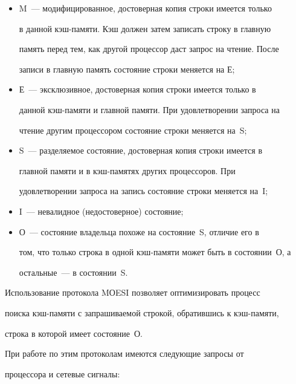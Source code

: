       \begin{itemize}


\item M~--- модифицированное, достоверная копия строки имеется только 


в данной кэш-памяти. Кэш должен затем записать строку в главную 


память перед тем, как другой процессор даст запрос на чтение. После 


записи в главную память состояние строки меняется на  Е;


\item Е~--- эксклюзивное, достоверная копия строки имеется только в 


данной кэш-па\-мя\-ти и главной памяти. При удовлетворении запроса на 


чтение другим процессором состояние строки меняется на~S;


\item  S~--- разделяемое состояние, достоверная копия строки имеется в 


главной памяти и в кэш-памятях других процессоров. При 


удовлетворении запроса на запись состояние строки меняется на~I;


\item  I~--- невалидное (недостоверное) состояние;


\item О~--- состояние владельца похоже на состояние~S, отличие его в 


том, что только строка в одной кэш-памяти может быть в состоянии~О, а 


остальные~--- в состоянии~S.


\end{itemize}





      Использование протокола MОESI  позволяет оптимизировать процесс 


поиска кэш-памяти с запрашиваемой строкой, обратившись к кэш-памяти, 


строка в которой имеет состояние~О. 


      


      При работе по этим протоколам имеются следующие запросы от 


процессора и сетевые сигналы:


